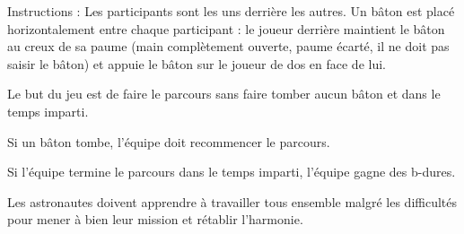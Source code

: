 \documentclass{grand-jeu}
\begin{document}
\begin{liste-materiel}
\end{liste-materiel}

\begin{regles}
Instructions : Les participants sont les uns derrière les autres. Un bâton est placé horizontalement entre chaque participant : le joueur derrière maintient le bâton au creux de sa paume (main complètement ouverte, paume écarté, il ne doit pas saisir le bâton) et appuie le bâton sur le joueur de dos en face de lui.

Le but du jeu est de faire le parcours sans faire tomber aucun bâton et dans le temps imparti.

Si un bâton tombe, l'équipe doit recommencer le parcours.

Si l'équipe termine le parcours dans le temps imparti, l'équipe gagne des b-dures. 
\end{regles}

\begin{imaginaire}
Les astronautes doivent apprendre à travailler tous ensemble malgré les difficultés pour mener à bien leur mission et rétablir l'harmonie.
\end{imaginaire}

\begin{moments-stop}
\end{moments-stop}
\end{document}
